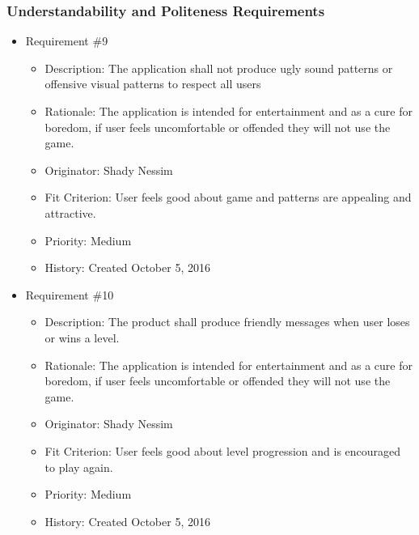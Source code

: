 \documentclass[12pt, titlepage]{article}
\begin{document}
\subsubsection{Understandability and Politeness Requirements}
\begin{itemize}

\item Requirement \#9
\begin{itemize}  
\item Description: The application shall not produce ugly sound patterns or offensive visual patterns to respect all users
\item Rationale: The application is intended for entertainment and as a cure for boredom, if user feels uncomfortable or offended they will not use the game.
\item Originator: Shady Nessim 
\item Fit Criterion: User feels good about game and patterns are appealing and attractive. 
\item Priority: Medium 
\item History: Created October 5, 2016
\end{itemize}

\item Requirement \#10
\begin{itemize} 
\item Description: The product shall produce friendly messages when user loses or wins a level.
\item Rationale: The application is intended for entertainment and as a cure for boredom, if user feels uncomfortable or offended they will not use the game.
\item Originator: Shady Nessim 
\item Fit Criterion: User feels good about level progression and is encouraged to play again. 
\item Priority: Medium 
\item History: Created October 5, 2016
\end{itemize}

\end{itemize}
\end{document}
